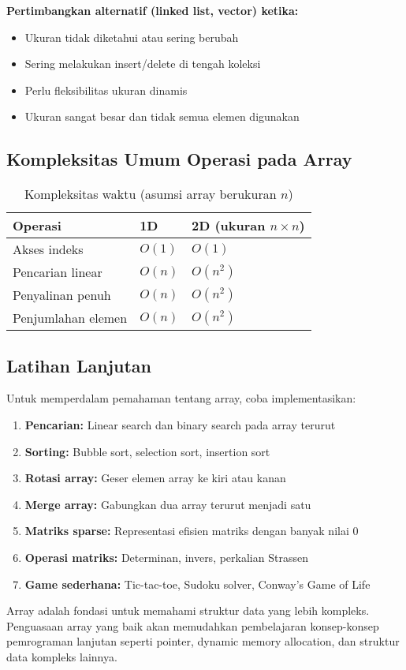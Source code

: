 \documentclass[../main.tex]{subfiles}
\begin{document}
\textbf{Pertimbangkan alternatif (linked list, vector) ketika:}
\begin{itemize}
  \item Ukuran tidak diketahui atau sering berubah
  \item Sering melakukan insert/delete di tengah koleksi
  \item Perlu fleksibilitas ukuran dinamis
  \item Ukuran sangat besar dan tidak semua elemen digunakan
\end{itemize}

\subsection{Kompleksitas Umum Operasi pada Array}
\begin{table}[H]
  \centering
  \caption{Kompleksitas waktu (asumsi array berukuran $n$)}
  \begin{tabular}{@{}lll@{}}
    \toprule
    Operasi & 1D & 2D (ukuran $n\times n$) \\
    \midrule
    Akses indeks & $O(1)$ & $O(1)$ \\
    Pencarian linear & $O(n)$ & $O(n^2)$ \\
    Penyalinan penuh & $O(n)$ & $O(n^2)$ \\
    Penjumlahan elemen & $O(n)$ & $O(n^2)$ \\
    \bottomrule
  \end{tabular}
\end{table}

\subsection{Latihan Lanjutan}

Untuk memperdalam pemahaman tentang array, coba implementasikan:
\begin{enumerate}
  \item \textbf{Pencarian:} Linear search dan binary search pada array terurut
  \item \textbf{Sorting:} Bubble sort, selection sort, insertion sort
  \item \textbf{Rotasi array:} Geser elemen array ke kiri atau kanan
  \item \textbf{Merge array:} Gabungkan dua array terurut menjadi satu
  \item \textbf{Matriks sparse:} Representasi efisien matriks dengan banyak nilai 0
  \item \textbf{Operasi matriks:} Determinan, invers, perkalian Strassen
  \item \textbf{Game sederhana:} Tic-tac-toe, Sudoku solver, Conway's Game of Life
\end{enumerate}

Array adalah fondasi untuk memahami struktur data yang lebih kompleks. Penguasaan array yang baik akan memudahkan pembelajaran konsep-konsep pemrograman lanjutan seperti pointer, dynamic memory allocation, dan struktur data kompleks lainnya.
\end{document}
